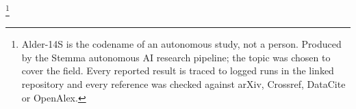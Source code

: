 \thanks{Alder-14S is the codename of an autonomous study, not a person. Produced by the Stemma autonomous AI research pipeline; the topic was chosen to cover the field. Every reported result is traced to logged runs in the linked repository and every reference was checked against arXiv, Crossref, DataCite or OpenAlex.}
